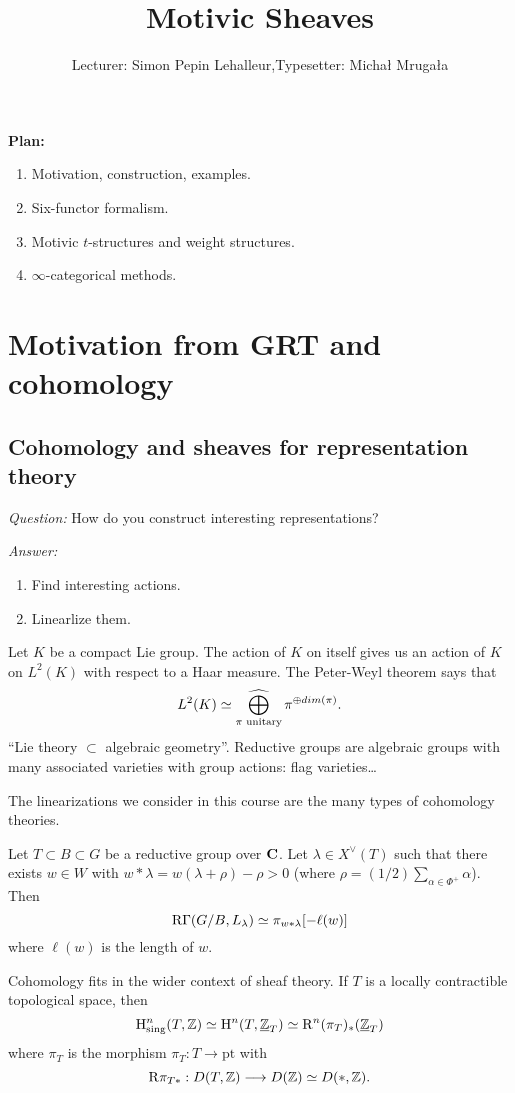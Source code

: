 

\def\Cone{\operatorname{Cone}}
\def\Ch{\cat{Ch}}
\def\ft{^{\text{(f.t)}}}

\title{Motivic Sheaves}
\author{Lecturer: Simon Pepin Lehalleur,\quad Typesetter: Micha{\l} Mruga{\l}a}


\maketitle
\textbf{Plan:}
\begin{enumerate}[L1:]
	\item Motivation, construction, examples.
	\item Six-functor formalism.
	\item Motivic $t$-structures and weight structures.
	\item $\infty$-categorical methods.
\end{enumerate}
\section{Motivation from GRT and cohomology}
\subsection{Cohomology and sheaves for representation theory} \leavevmode

\emph{Question:} How do you construct interesting representations?

\emph{Answer:}
\begin{enumerate}[1)]
	\item Find interesting actions.
	\item Linearlize them.
\end{enumerate}

\begin{example}
	Let $K$ be a compact Lie group. The action of $K$ on itself gives us an action of $K$ on $L^2(K)$ with respect to a Haar measure. The Peter-Weyl theorem says that
	\[
	L^2(K) \isoto \cbigoplus_{\pi\text{ unitary}}\pi^{\oplus dim(\pi)}.
	\]
	``Lie theory $\subset $ algebraic geometry''. Reductive groups are algebraic groups with many associated varieties with group actions: flag varieties\dots
\end{example}
The linearizations we consider in this course are the many types of cohomology theories.

\begin{example}
	Let $T\subset B\subset G$ be a reductive group over $\mathbf{C}$. Let $\lambda\in X^{\vee}(T)$ such that there exists $w\in W$ with $w*\lambda = w(\lambda+\rho)-\rho>0$ (where $\rho = (1 /2)\sum_{\alpha\in \Phi^{+}}\alpha$). Then
	\[
		\mathrm{R}\Gamma(G /B,L_\lambda) \simeq \pi_{w*\lambda}[-\ell(w)]
	\] 
	where $\ell(w)$ is the length of $w$.
\end{example}
Cohomology fits in the wider context of sheaf theory. If $T$ is a locally contractible topological space, then
\[
	\mathrm{H}^{n}_{\text{sing}}(T,\mathbb Z) \simeq \mathrm{H}^{n}(T,\underline{\mathbb{Z}}_T) \simeq \mathrm{R}^{n}(\pi_T)_*(\underline{\mathbb{Z}}_T)	
\]
where $\pi_T$ is the morphism $\pi_T:T\to \text{pt}$ with
\[
\RD\pi_{T*}:D(T,\Z) \to D(\Z) \isoto D(*,\Z)
.\] 

